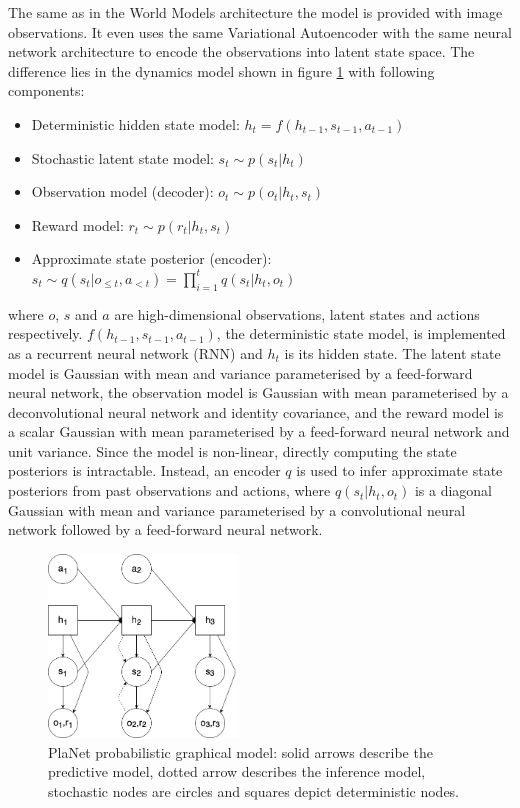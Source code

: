 The same as in the World Models architecture the model is provided with image observations. It even uses the same Variational Autoencoder with the same neural network architecture to encode the observations into latent state space. The difference lies in the dynamics model shown in figure \ref{Fig.PlaNetPGM} with following components:
\begin{itemize}
\item Deterministic hidden state model:      $h_t = f(h_{t-1}, s_{t-1}, a_{t-1})$
\item Stochastic latent state model:         $s_t \sim p(s_t|h_t)$
\item Observation model (decoder):           $o_t \sim p(o_t|h_t, s_t)$
\item Reward model:                          $r_t \sim p(r_t|h_t, s_t)$
\item Approximate state posterior (encoder): $s_t \sim q(s_t|o_{\leqslant t}, a_{< t}) = \prod_{i=1}^tq(s_t|h_t,o_t)$
\end{itemize}
where $o$, $s$ and $a$ are high-dimensional observations, latent states and actions respectively. $f(h_{t-1}, s_{t-1}, a_{t-1})$, the deterministic state model, is implemented as a recurrent neural network (RNN) and $h_t$ is its hidden state. The latent state model is Gaussian with mean and variance parameterised by a feed-forward neural network, the observation model is Gaussian with mean parameterised by a deconvolutional neural network and identity covariance, and the reward model is a scalar Gaussian with mean parameterised by a feed-forward neural network and unit variance. Since the model is non-linear, directly computing the state posteriors is intractable. Instead, an encoder $q$ is used to infer approximate state posteriors from past observations and actions, where $q(s_t | h_t, o_t)$ is a diagonal Gaussian with mean and variance parameterised by a convolutional neural network followed by a feed-forward neural network.

\begin{figure}[H]
\includegraphics[width=0.45\textwidth,keepaspectratio]{figures/PlaNet/prob_graph_model.png}
\caption[World Models probabilistic graphical model]{PlaNet probabilistic graphical model: solid arrows describe the predictive model, dotted arrow describes the inference model, stochastic nodes are circles and squares depict deterministic nodes.}
\label{Fig.PlaNetPGM}
\end{figure}

